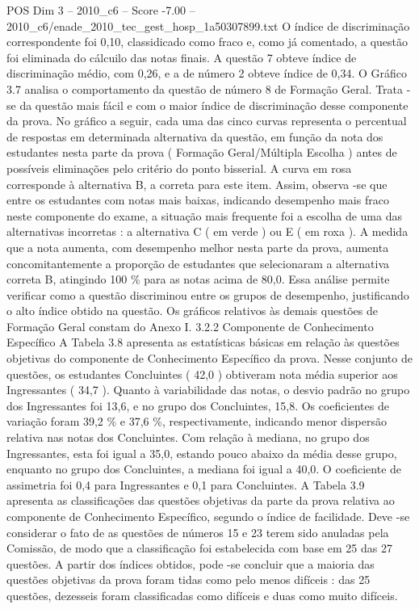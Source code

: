 \begin{textsample}{POS Dim 3 – 2010\_c6 – Score -7.00 – 2010\_c6/enade\_2010\_tec\_gest\_hosp\_1a50307899.txt}
O índice de discriminação correspondente foi 0,10, classidicado como fraco e, como já comentado, a questão foi eliminada do cálcuilo das notas finais.
A questão 7 obteve índice de discriminação médio, com 0,26, e a de número 2 obteve índice de 0,34.
O Gráfico 3.7 analisa o comportamento da questão de número 8 de Formação Geral.
Trata -se da questão mais fácil e com o maior índice de discriminação desse componente da prova.
No gráfico a seguir, cada uma das cinco curvas representa o percentual de respostas em determinada alternativa da questão, em função da nota dos estudantes nesta parte da prova ( Formação Geral/Múltipla Escolha ) antes de possíveis eliminações pelo critério do ponto bisserial.
A curva em rosa corresponde à alternativa B, a correta para este item.
Assim, observa -se que entre os estudantes com notas mais baixas, indicando desempenho mais fraco neste componente do exame, a situação mais frequente foi a escolha de uma das alternativas incorretas : a alternativa C ( em verde ) ou E ( em roxa ).
A medida que a nota aumenta, com desempenho melhor nesta parte da prova, aumenta concomitantemente a proporção de estudantes que selecionaram a alternativa correta B, atingindo 100 \% para as notas acima de 80,0.
Essa análise permite verificar como a questão discriminou entre os grupos de desempenho, justificando o alto índice obtido na questão.
Os gráficos relativos às demais questões de Formação Geral constam do Anexo I. 3.2.2 Componente de Conhecimento Específico A Tabela 3.8 apresenta as estatísticas básicas em relação às questões objetivas do componente de Conhecimento Específico da prova.
Nesse conjunto de questões, os estudantes Concluintes ( 42,0 ) obtiveram nota média superior aos Ingressantes ( 34,7 ).
Quanto à variabilidade das notas, o desvio padrão no grupo dos Ingressantes foi 13,6, e no grupo dos Concluintes, 15,8.
Os coeficientes de variação foram 39,2 \% e 37,6 \%, respectivamente, indicando menor dispersão relativa nas notas dos Concluintes.
Com relação à mediana, no grupo dos Ingressantes, esta foi igual a 35,0, estando pouco abaixo da média desse grupo, enquanto no grupo dos Concluintes, a mediana foi igual a 40,0.
O coeficiente de assimetria foi 0,4 para Ingressantes e 0,1 para Concluintes.
A Tabela 3.9 apresenta as classificações das questões objetivas da parte da prova relativa ao componente de Conhecimento Específico, segundo o índice de facilidade.
Deve -se considerar o fato de as questões de números 15 e 23 terem sido anuladas pela Comissão, de modo que a classificação foi estabelecida com base em 25 das 27 questões.
A partir dos índices obtidos, pode -se concluir que a maioria das questões objetivas da prova foram tidas como pelo menos difíceis : das 25 questões, dezesseis foram classificadas como difíceis e duas como muito difíceis.

\end{textsample}
